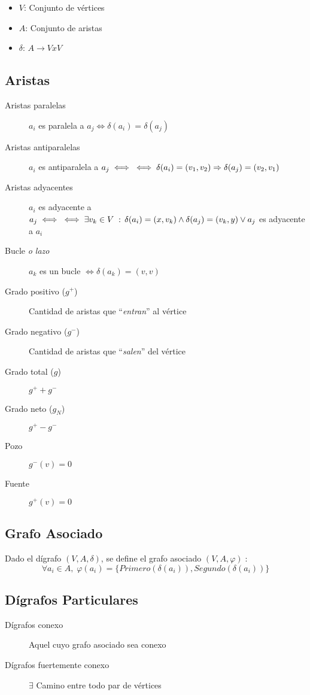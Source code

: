 \documentclass[a4paper]{article}
\numberwithin{equation}{section}
\numberwithin{figure}{section}
\numberwithin{table}{section}
\newcommand{\refa}[1]{}
\newcommand{\talque}{\;:\,} %
\begin{document}
\begin{itemize}
	\item $V$: Conjunto de v\'ertices
    \item $A$: Conjunto de aristas
    \item $\delta $: $A \to VxV$
\end{itemize}

\subsection{Aristas}
\begin{description}
	\item[Aristas paralelas] $a_i$ es paralela a $a_j \iff \delta(a_i) = \delta(a_j)$
    \item[Aristas antiparalelas] $a_i$ es antiparalela a $a_j \iff \\ \iff \delta(a_i) = (v_1, v_2) \Rightarrow  \delta(a_j) = (v_2, v_1)$
    \item[Aristas adyacentes] $a_i$ es adyacente a $a_j \iff \\ \iff \exists v_k \in V \talque \delta(a_i) = (x, v_k) \land \delta (a_j) = (v_k, y) \lor a_j$ es adyacente a $a_i$
    \item[Bucle \emph{o lazo}] $a_k$ es un bucle $\iff \delta(a_k) = (v,v)$
	\item[Grado positivo ($g^+$)] Cantidad de aristas que ``\emph{entran}'' al v\'ertice
    \item[Grado negativo ($g^-$)] Cantidad de aristas que ``\emph{salen}'' del v\'ertice
    \item[Grado total ($g$)] $g^+ + g^-$
    \item[Grado neto ($g_N$)] $g^+ - g^-$
    \item[Pozo] $g^-(v) = 0$
    \item[Fuente] $g^+(v) = 0$
\end{description}

\subsection{Grafo Asociado}
Dado el d\'igrafo $(V,A,\delta)$, se define el grafo asociado $(V,A,\varphi)\talque$
$$
	\forall a_i \in A,\; \varphi(a_i) = \{Primero(\delta(a_i)), Segundo(\delta(a_i))\}
$$

\subsection{D\'igrafos Particulares}
\begin{description}
	\item[D\'igrafos conexo] Aquel cuyo grafo asociado sea conexo\refa{conexo}
    \item[D\'igrafos fuertemente conexo] $\exists$ Camino\refa{camino} entre todo par de v\'ertices
\end{description}
\end{document}
